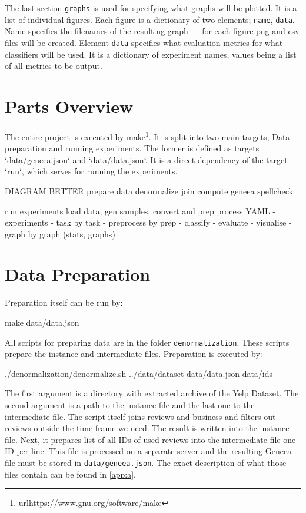 The last section \texttt{graphs} is used for specifying what graphs will be plotted.
It is a list of individual figures.
Each figure is a dictionary of two elements; \texttt{name}, \texttt{data}.
Name specifies the filenames of the resulting graph ---
for each figure png and csv files will be created.
Element \texttt{data} specifies what evaluation metrics for what classifiers will be used.
It is a dictionary of experiment names, values being a list of all metrics to be output.

\section{Parts Overview}

The entire project is executed by make\footnote{url{https://www.gnu.org/software/make}}.
It is split into two main targets;
Data preparation and running experiments.
The former is defined as targets `data/geneea.json` and `data/data.json`.
It is a direct dependency of the target `run`, which serves for running the experiments.

\begin{code}
DIAGRAM BETTER
prepare data
	denormalize
	join
	compute geneea
	spellcheck

run experiments
	load data, gen samples, convert and prep
	process YAML
		- experiments
			- task by task
				- preprocess by prep
				- classify
				- evaluate
		- visualise
			- graph by graph (stats, graphs)
\end{code}


\section{Data Preparation} 

Preparation itself can be run by:

\begin{code}
make data/data.json
\end{code}

All scripts for preparing data are in the folder \texttt{denormalization}.
These scripts prepare the instance and intermediate files.
Preparation is executed by:

\begin{code}
./denormalization/denormalize.sh ../data/dataset data/data.json data/ids
\end{code}

The first argument is a directory with extracted archive of the Yelp Dataset.
The second argument is a path to the instance file and the last one to the intermediate file.
The script itself joins reviews and business
and filters out reviews outside the time frame we need.
The result is written into the instance file.
Next, it prepares list of all IDs of used reviews into the intermediate file one ID per line.
This file is processed on a separate server and the resulting Geneea file must be stored
in \texttt{data/geneea.json}.
The exact description of what those files contain can be found in \autoref{app:a}.


